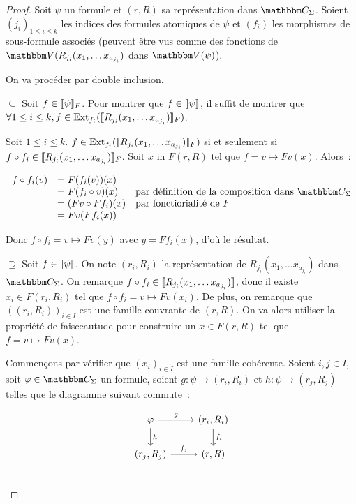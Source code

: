 \begin{proof}
    Soit $\psi$ un formule et $(r,R)$ sa représentation dans $\C_\Sigma$.
    Soient $(j_i)_{1\leq i\leq k}$ les indices des formules atomiques de $\psi$
    et $(f_i)$ les morphismes de sous-formule associés (peuvent être vus comme
    des fonctions de $\V(R_{j_i}(x_1,\dots x_{a_{j_i}})$ dans $\V(\psi)$).

    On va procéder par double inclusion.

    $\boxed{\subseteq}$ Soit $f\in\llbracket {\psi} \rrbracket_F$.  Pour montrer que
    $f\in\llbracket {\psi} \rrbracket$, il suffit de montrer que $\forall 1\leq i\leq k,
    f\in\text{Ext}_{f_i}(\llbracket {R_{j_i}(x_1,\dots x_{a_{j_i}})} \rrbracket_F)$.

    Soit $1\leq i\leq k$. $f\in\text{Ext}_{f_i}(\llbracket {R_{j_i}(x_1,\dots
    x_{a_{j_i}})} \rrbracket_F)$ si et seulement si $f\circ f_i\in\llbracket {R_{j_i}(x_1,\dots
    x_{a_{j_i}})} \rrbracket_F$. Soit $x$ in $F(r,R)$ tel que $f = v\mapsto Fv(x)$.
    Alors~:
    
    \[\begin{array}{rll}
        f\circ f_i(v) &= F(f_i(v))(x) & \\
         &= F(f_i\circ v)(x) & \text{par définition de la composition dans } \C_\Sigma\\
         &= (Fv\circ Ff_i)(x) & \text{par fonctiorialité de } F\\
         &= Fv(Ff_i(x)) & \\
    \end{array}\]

    Donc $f\circ f_i = v\mapsto Fv(y)$ avec $y = Ff_i(x)$, d'où le résultat.

    $\boxed{\supseteq}$ Soit $f\in\llbracket {\psi} \rrbracket$. On note $(r_i,R_i)$ la
    représentation de $R_{j_i}(x_1,\dots x_{a_{j_i}})$ dans $\C_\Sigma$. On
    remarque $f\circ f_i\in\llbracket {R_{j_i}(x_1,\dots x_{a_{j_i}})} \rrbracket$, donc il existe
    $x_i\in F(r_i,R_i)$ tel que $f\circ f_i = v\mapsto Fv(x_i)$. De plus, on remarque que
    $((r_i,R_i))_{i\in I}$ est une famille couvrante de $(r,R)$. On va alors utiliser
    la propriété de faisceautude pour construire un $x\in F(r,R)$ tel que
    $f = v\mapsto Fv(x)$.

    Commençons par vérifier que $(x_i)_{i\in I}$ est une famille cohérente. Soient
    $i,j\in I$, soit $\phi\in\C_\Sigma$ un formule, soient $g:\psi\rightarrow (r_i,R_i)$
    et $h:\psi\rightarrow (r_j,R_j)$ telles que le diagramme suivant commute~:

    \[\begin{tikzcd}
        \phi \arrow[r, "g"] \arrow[d, "h"] & (r_i,R_i) \arrow[d, "f_i"] \\
          (r_j,R_j) \arrow[r, "f_j"] & (r,R) \\
    \end{tikzcd}\]


\end{proof}
